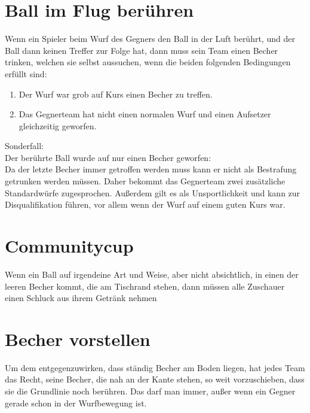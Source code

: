 \documentclass[a5paper, 12pt]{book}
\begin{document}
\section{Ball im Flug berühren}\label{ballimflugberühren}
Wenn ein Spieler beim Wurf des Gegners den Ball in der Luft berührt, und der Ball dann keinen Treffer zur Folge hat, dann muss sein Team einen Becher trinken, welchen sie selbst aussuchen, wenn die beiden folgenden Bedingungen erfüllt sind:
\begin{enumerate}[(1)]
    \item Der Wurf war grob auf Kurs einen Becher zu treffen.
    \item Das Gegnerteam hat nicht einen normalen Wurf und einen Aufsetzer gleichzeitig geworfen.
\end{enumerate}

Sonderfall: \\Der berührte Ball wurde auf nur einen Becher geworfen:\\
	Da der letzte Becher immer getroffen werden muss kann er nicht als Bestrafung getrunken werden müssen. Daher bekommt das Gegnerteam zwei zusätzliche Standardwürfe zugesprochen. 
Außerdem gilt es als Unsportlichkeit und kann zur Disqualifikation führen, vor allem wenn der Wurf auf einem guten Kurs war.

\section{Communitycup}\label{communitycup}
Wenn ein Ball auf irgendeine Art und Weise, aber nicht absichtlich, in einen der leeren Becher kommt, die am Tischrand stehen, dann müssen alle Zuschauer einen Schluck aus ihrem Getränk nehmen
\section{Becher vorstellen}\label{bechervorstellen}
Um dem entgegenzuwirken, dass ständig Becher am Boden liegen, hat jedes Team das Recht, seine Becher, die nah an der Kante stehen, so weit vorzuschieben, dass sie die Grundlinie noch berühren. 
Das darf man immer, außer wenn ein Gegner gerade schon in der Wurfbewegung ist. 
\end{document}
